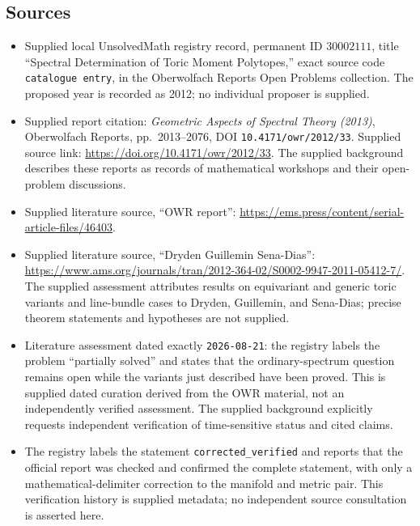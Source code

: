 \documentclass[11pt]{article}
\begin{document}
\subsection{Sources}
\begin{itemize}
\item Supplied local UnsolvedMath registry record, permanent ID \(30002111\), title ``Spectral Determination of Toric Moment Polytopes,'' exact source code \texttt{catalogue entry}, in the Oberwolfach Reports Open Problems collection. The proposed year is recorded as 2012; no individual proposer is supplied.
\item Supplied report citation: \emph{Geometric Aspects of Spectral Theory (2013)}, Oberwolfach Reports, pp.~2013--2076, DOI \texttt{10.4171/owr/2012/33}. Supplied source link: \url{https://doi.org/10.4171/owr/2012/33}. The supplied background describes these reports as records of mathematical workshops and their open-problem discussions.
\item Supplied literature source, ``OWR report'': \url{https://ems.press/content/serial-article-files/46403}.
\item Supplied literature source, ``Dryden Guillemin Sena-Dias'': \url{https://www.ams.org/journals/tran/2012-364-02/S0002-9947-2011-05412-7/}. The supplied assessment attributes results on equivariant and generic toric variants and line-bundle cases to Dryden, Guillemin, and Sena-Dias; precise theorem statements and hypotheses are not supplied.
\item Literature assessment dated exactly \texttt{2026-08-21}: the registry labels the problem ``partially solved'' and states that the ordinary-spectrum question remains open while the variants just described have been proved. This is supplied dated curation derived from the OWR material, not an independently verified assessment. The supplied background explicitly requests independent verification of time-sensitive status and cited claims.
\item The registry labels the statement \texttt{corrected\_verified} and reports that the official report was checked and confirmed the complete statement, with only a mathematical-delimiter correction to the manifold and metric pair. This verification history is supplied metadata; no independent source consultation is asserted here.
\end{itemize}
\end{document}
